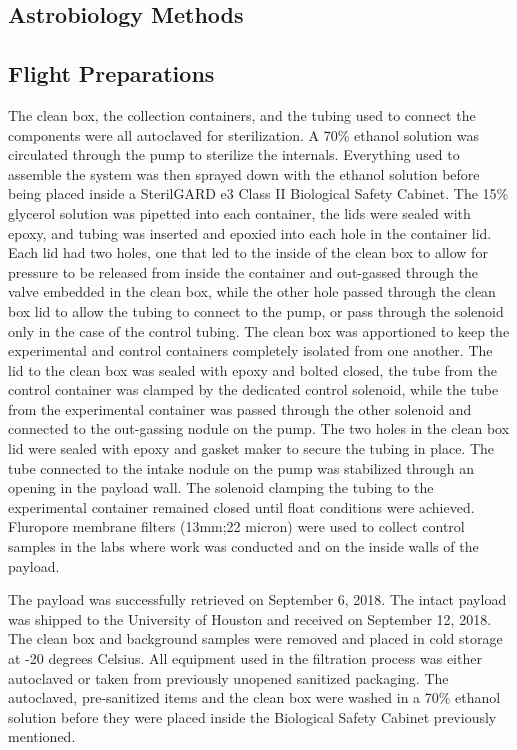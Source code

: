 \subsection{Astrobiology Methods}
\label{sec:Astrobiology Methods}
\subsection{ Flight Preparations }
 The clean box, the collection containers, and the tubing used to connect the components were all autoclaved for sterilization. A 70\% ethanol solution was circulated through the pump to sterilize the internals. Everything used to assemble the system was then sprayed down with the ethanol solution before being placed inside a SterilGARD e3 Class II Biological Safety Cabinet. The 15\% glycerol solution was pipetted into each container, the lids were sealed with epoxy, and tubing was inserted and epoxied into each hole in the container lid. Each lid had two holes, one that led to the inside of the clean box to allow for pressure to be released from inside the container and out-gassed through the valve embedded in the clean box, while the other hole passed through the clean box lid to allow the tubing to connect to the pump, or pass through the solenoid only in the case of the control tubing. The clean box was apportioned to keep the experimental and control containers completely isolated from one another. The lid to the clean box was sealed with epoxy and bolted closed, the tube from the control container was clamped by the dedicated control solenoid, while the tube from the experimental container was passed through the other solenoid and connected to the out-gassing nodule on the pump. The two holes in the clean box lid were sealed with epoxy and gasket maker to secure the tubing in place. The tube connected to the intake nodule on the pump was stabilized through an opening in the payload wall. The solenoid clamping the tubing to the experimental container remained closed until float conditions were achieved. Fluropore membrane filters (13mm;22 micron) were used to collect control samples in the labs where work was conducted and on the inside walls of the payload. 
 
 The payload was successfully retrieved on September 6, 2018. The intact payload was shipped to the University of Houston and received on September 12, 2018. The clean box and background samples were removed and placed in cold storage at -20 degrees Celsius. All equipment used in the filtration process was either autoclaved or taken from previously unopened sanitized packaging. The autoclaved, pre-sanitized items and the clean box were washed in a 70\% ethanol solution before they were placed inside the Biological Safety Cabinet previously mentioned. 
 
